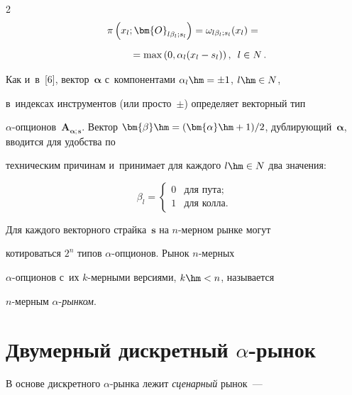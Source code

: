 \begin{multicols}{2}
\begin{multline}
  \pi\left( x_l; \bm{O}_{l\beta_l;s_l}\right) =\omega_{l\beta_l;s_l}(x_l)={}\\[6pt]


  \hspace*{10mm}{}=\max  \left(0,\alpha_l (x_l-s_l)\right), \enskip l\in N\,.


    \label{e9-aga}


  \end{multline}


  


  Как и~в~[6], вектор~$\bm{\alpha}$ с~компонентами $\alpha_l\hm= \pm1$, $l\hm\in N$, 


в~индексах инструментов (или просто~$\pm$) определяет векторный тип  


$\alpha$-оп\-ци\-онов~$\bm{A}_{\bm{\alpha};\bm{s}}$. Вектор $\bm{\beta}\hm= 


(\bm{\alpha}\hm+1)/2$, дублирующий~$\bm{\alpha}$, вводится для удобства по 


техническим причинам и~принимает для каждого $l\hm\in N$ два значения: 


$$


\beta_l= \begin{cases}


0 &\mbox{для\ пута;}\\ 


1 & \mbox{для\ колла.}


\end{cases}


$$ 


  


  Для каждого векторного страйка~$\bm{s}$ на $n$-мер\-ном рынке могут 


котироваться $2^n$ типов $\alpha$-оп\-ци\-онов. Рынок $n$-мер\-ных  


$\alpha$-оп\-ци\-онов с~их $k$-мер\-ны\-ми версиями, $k\hm< n$, называется  


$n$-мер\-ным $\alpha$-\textit{рын\-ком}. 


  


  \section{Двумерный дискретный $\alpha$-рынок}


   


  В основе дискретного $\alpha$-рын\-ка лежит \textit{сценарный} рынок~--- 



\end{multicols}
